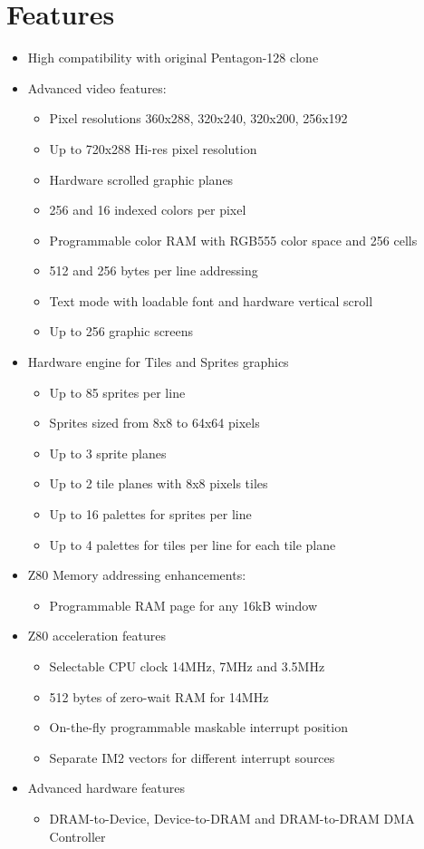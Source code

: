 \chapter{Features}

\begin{itemize}
\item High compatibility with original Pentagon-128 clone
\item Advanced video features:
  \begin{itemize}
  \item Pixel resolutions 360x288, 320x240, 320x200, 256x192
  \item Up to 720x288 Hi-res pixel resolution
  \item Hardware scrolled graphic planes
  \item 256 and 16 indexed colors per pixel
  \item Programmable color RAM with RGB555 color space and 256 cells
  \item 512 and 256 bytes per line addressing
  \item Text mode with loadable font and hardware vertical scroll
  \item Up to 256 graphic screens
  \end{itemize}
\item Hardware engine for Tiles and Sprites graphics
  \begin{itemize}
  \item Up to 85 sprites per line
  \item Sprites sized from 8x8 to 64x64 pixels
  \item Up to 3 sprite planes
  \item Up to 2 tile planes with 8x8 pixels tiles
  \item Up to 16 palettes for sprites per line
  \item Up to 4 palettes for tiles per line for each tile plane
  \end{itemize}
\item Z80 Memory addressing enhancements:
  \begin{itemize}
  \item Programmable RAM page for any 16kB window
  \end{itemize}
\item Z80 acceleration features
  \begin{itemize}
  \item Selectable CPU clock 14MHz, 7MHz and 3.5MHz
  \item 512 bytes of zero-wait RAM for 14MHz
  \item On-the-fly programmable maskable interrupt position
  \item Separate IM2 vectors for different interrupt sources
  \end{itemize}
\item Advanced hardware features
  \begin{itemize}
  \item DRAM-to-Device, Device-to-DRAM and DRAM-to-DRAM DMA Controller
  \end{itemize}
\end{itemize}
